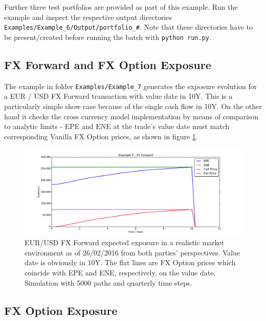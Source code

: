\documentclass[12pt, a4paper]{article}
\begin{document}
Further three test portfolios are provided as part of this example. Run the example and inspect the respective output
directories {\tt Examples/Example\_6/Output/portfolio\_\#}. Note that these directories have to be present/created
before running the batch with {\tt python run.py}.

\subsection{FX Forward and FX Option Exposure}\label{sec:fxfwd}

The example in folder {\tt Examples/Example\_7} generates the exposure evolution for a EUR / USD FX Forward transaction
with value date in 10Y. This is a particularly simple show case because of the single cash flow in 10Y. On the other
hand it checks the cross currency model implementation by means of comparison to analytic limits - EPE and ENE at the
trade's value date must match corresponding Vanilla FX Option prices, as shown in figure \ref{fig_5}.
\begin{figure}[h]
\begin{center}
\includegraphics[scale=0.45]{mpl_fxforward.pdf}
\end{center}
\caption{EUR/USD FX Forward expected exposure in a realistic market environment as of 26/02/2016 from both parties'
  perspectives. Value date is obviously in 10Y. The flat lines are FX Option prices which coincide with EPE and ENE,
  respectively, on the value date. Simulation with 5000 paths and quarterly time steps.}
\label{fig_5}
\end{figure}

\subsection*{FX Option Exposure}\label{sec:fxoption}
\end{document}
